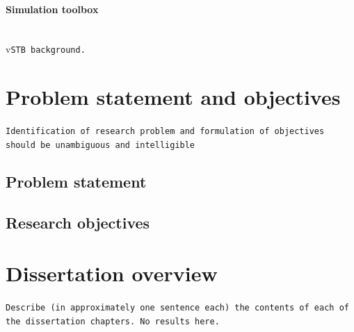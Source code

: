 \paragraph{Simulation toolbox}\leavevmode\\
v\texttt{STB background.}
\section{Problem statement and objectives}
\texttt{Identification of research problem and formulation of objectives should be unambiguous and intelligible}
\subsection{Problem statement}
\subsection{Research objectives}

\section{Dissertation overview}
\texttt{Describe (in approximately one sentence each) the contents of each of the dissertation chapters. No results here.}